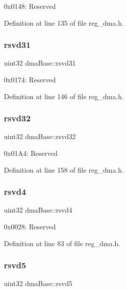 0x0148\+: Reserved 

Definition at line 135 of file reg\+\_\+dma.\+h.

\mbox{\label{structdmaBase_a9d5f84df9ad61c3a786aad4856aaf0e7}} 
\subsubsection{\texorpdfstring{rsvd31}{rsvd31}}
{\footnotesize\ttfamily uint32 dma\+Base\+::rsvd31}

0x0174\+: Reserved 

Definition at line 146 of file reg\+\_\+dma.\+h.

\mbox{\label{structdmaBase_a16ac26ca8dcbf80601d70f8e1ae758a6}} 
\subsubsection{\texorpdfstring{rsvd32}{rsvd32}}
{\footnotesize\ttfamily uint32 dma\+Base\+::rsvd32}

0x01\+A4\+: Reserved 

Definition at line 158 of file reg\+\_\+dma.\+h.

\mbox{\label{structdmaBase_a3c3cee1790a17eb51175ed8f39865e98}} 
\subsubsection{\texorpdfstring{rsvd4}{rsvd4}}
{\footnotesize\ttfamily uint32 dma\+Base\+::rsvd4}

0x0028\+: Reserved 

Definition at line 83 of file reg\+\_\+dma.\+h.

\mbox{\label{structdmaBase_a87b68adeeb0bcbe8f2c95a7fb57ae053}} 
\subsubsection{\texorpdfstring{rsvd5}{rsvd5}}
{\footnotesize\ttfamily uint32 dma\+Base\+::rsvd5}

